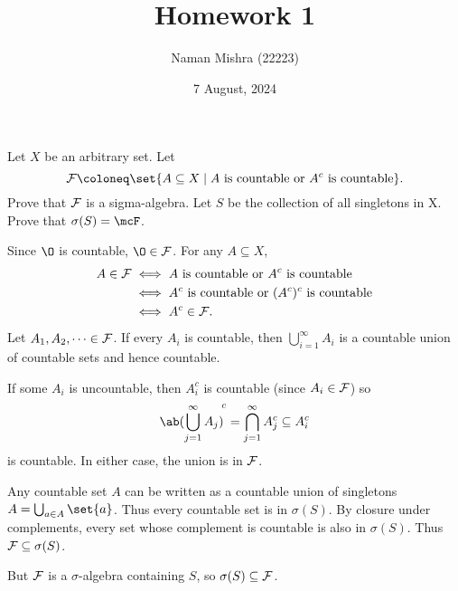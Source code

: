 \documentclass[12pt]{article}
\title{Homework 1}
\author{Naman Mishra (22223)}
\date{7 August, 2024}
\begin{document}
\maketitle

\begin{problem} \label{prb:countable}
    Let $X$ be an arbitrary set.
    Let \[
        \F \coloneq \set{A \subseteq X \mid
                A \text{ is countable or } A^c \text{ is countable}}.
    \]
    Prove that $\mathcal F$ is a sigma-algebra.
    Let $S$ be the collection of all singletons in X.
    Prove that $\sigma(S) = \mcF$.
\end{problem}
\begin{solution}
    Since $\O$ is countable, $\O \in \F$.
    For any $A \subseteq X$, \begin{align*}
        A \in \mathcal F
            &\iff A \text{ is countable or } A^c \text{ is countable} \\
            &\iff A^c \text{ is countable or } (A^c)^c \text{ is countable} \\
            &\iff A^c \in \mathcal F.
    \end{align*}
    Let $A_1, A_2, \dots \in \mathcal F$.
    If every $A_i$ is countable, then
    $\bigcup_{i=1}^\infty A_i$ is a countable union of countable sets and
    hence countable.

    If some $A_i$ is uncountable, then $A_i^c$ is countable
    (since $A_i \in \mathcal F$) so \[
        {\ab(\bigcup_{j=1}^\infty A_j)\!}^c
            = \bigcap_{j=1}^\infty A_j^c
            \subseteq A_i^c
    \] is countable.
    In either case, the union is in $\mathcal F$.

    Any countable set $A$ can be written as a countable union of singletons
    $A = \bigcup_{a \in A} \set{a}$.
    Thus every countable set is in $\sigma(S)$.
    By closure under complements, every set whose complement is countable
    is also in $\sigma(S)$.
    Thus $\mathcal F \subseteq \sigma(S)$.

    But $\mathcal F$ is a $\sigma$-algebra containing $S$,
    so $\sigma(S) \subseteq \mathcal F$.
\end{solution}
\end{document}
